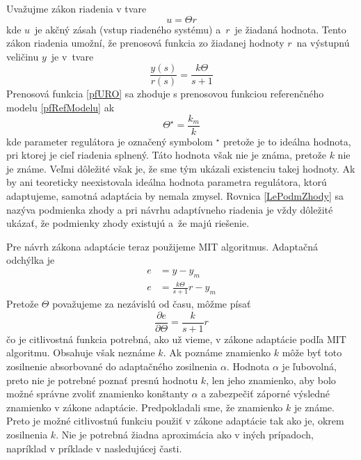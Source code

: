 \documentclass[a4paper, 10pt, ]{article}
\begin{document}
Uvažujme zákon riadenia v tvare
\begin{equation}
	u = \Theta r
\end{equation}
kde $u$~je akčný zásah (vstup riadeného systému) a~$r$~je žiadaná hodnota. Tento zákon riadenia umožní, že prenosová funkcia zo žiadanej hodnoty $r$~na výstupnú veličinu $y$~je v~tvare
\begin{equation} \label{pfURO}
	\frac{y(s)}{r(s)} = \frac{k \Theta}{s + 1}
\end{equation}
Prenosová funkcia \eqref{pfURO} sa zhoduje s prenosovou funkciou referenčného modelu \eqref{pfRefModelu} ak
\begin{equation} \label{LePodmZhody}
	\Theta^\star = \frac{k_m}{k}
\end{equation}
kde parameter regulátora je označený symbolom $^\star$ pretože je to ideálna hodnota, pri ktorej je cieľ riadenia splnený. Táto hodnota však nie je známa, pretože $k$ nie je známe. Veľmi dôležité však je, že sme tým ukázali existenciu takej hodnoty. Ak by ani teoreticky neexistovala ideálna hodnota parametra regulátora, ktorú adaptujeme, samotná adaptácia by nemala zmysel. Rovnica \eqref{LePodmZhody} sa nazýva podmienka zhody a pri návrhu adaptívneho riadenia je vždy dôležité ukázať, že podmienky zhody existujú a~že majú riešenie.

Pre návrh zákona adaptácie teraz použijeme MIT algoritmus. Adaptačná odchýlka je
\begin{subequations}
	\begin{align}
		e &= y - y_m \\
		e &= \frac{k \Theta}{s + 1} r - y_m
	\end{align}
\end{subequations}
Pretože $\Theta$ považujeme za nezávislú od času, môžme písať
\begin{equation} \label{parcDerBezAprox}
	\frac{\partial e}{\partial \Theta}
	=
	\frac{k}{s + 1} r
\end{equation}
čo je citlivostná funkcia potrebná, ako už vieme, v zákone adaptácie podľa MIT algoritmu. Obsahuje však neznáme $k$. Ak poznáme znamienko $k$ môže byť toto zosilnenie absorbované do adaptačného zosilnenia $\alpha$. Hodnota $\alpha$ je ľubovolná, preto nie je potrebné poznať presnú hodnotu $k$, len jeho znamienko, aby bolo možné správne zvoliť znamienko konštanty $\alpha$ a zabezpečiť záporné výsledné znamienko v zákone adaptácie. Predpokladali sme, že znamienko $k$ je známe. Preto je možné citlivostnú funkciu použiť v zákone adaptácie tak ako je, okrem zosilnenia $k$. Nie je potrebná žiadna aproximácia ako v iných prípadoch, napríklad v príklade v nasledujúcej časti.
\end{document}

